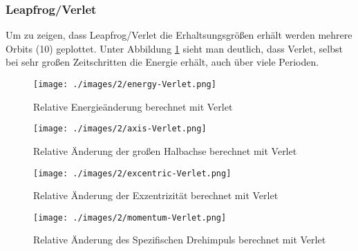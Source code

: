 \subsubsection{Leapfrog/Verlet}
Um zu zeigen, dass Leapfrog/Verlet die Erhaltsungsgrößen erhält
werden mehrere Orbits (10) geplottet. Unter Abbildung \ref{fig:2body:verlet:energy}
sieht man deutlich, dass Verlet, selbst bei sehr großen Zeitschritten
die Energie erhält, auch über viele Perioden.
\begin{figure}
  \begin{center}
    \texttt{[image: ./images/2/energy-Verlet.png]}
  \end{center}
  \caption{Relative Energieänderung berechnet mit Verlet}
  \label{fig:2body:verlet:energy}
\end{figure}
\begin{figure}
  \begin{center}
    \texttt{[image: ./images/2/axis-Verlet.png]}
  \end{center}
  \caption{Relative \"Anderung der großen Halbachse berechnet mit Verlet}
  \label{fig:2body:verlet:axis}
\end{figure}
\begin{figure}
  \begin{center}
    \texttt{[image: ./images/2/excentric-Verlet.png]}
  \end{center}
  \caption{Relative \"Anderung der Exzentrizität berechnet mit Verlet}
  \label{fig:2body:verlet:excentric}
\end{figure}
\begin{figure}
  \begin{center}
    \texttt{[image: ./images/2/momentum-Verlet.png]}
  \end{center}
  \caption{Relative \"Anderung des Spezifischen Drehimpuls berechnet mit Verlet}
  \label{fig:2body:verlet:spec_angular_momentum}
\end{figure}

